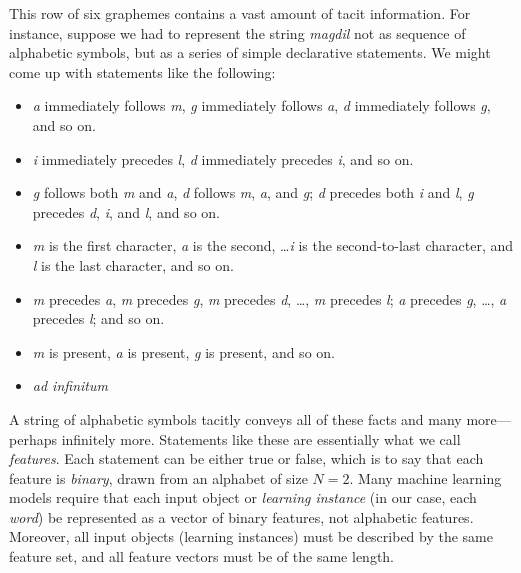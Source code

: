 This row of six graphemes contains a vast amount of tacit information. For instance, suppose we had to represent the string \textit{magdil} not as sequence of alphabetic symbols, but as a series of simple declarative statements. We might come up with statements like the following: 
\begin{itemize}
  \item \textit{a} immediately follows \textit{m}, \textit{g} immediately follows \textit{a}, \textit{d} immediately follows \textit{g}, and so on. 
  \item \textit{i} immediately precedes \textit{l}, \textit{d} immediately precedes \textit{i}, and so on. %
   \item \textit{g} follows both \textit{m} and \textit{a}, \textit{d} follows \textit{m}, \textit{a}, and \textit{g}; \textit{d} precedes both \textit{i} and \textit{l}, \textit{g} precedes \textit{d}, \textit{i}, and \textit{l}, and so on.
   \item \textit{m} is the first character, \textit{a} is the second, \dots \textit{i} is the second-to-last character, and \textit{l} is the last character, and so on.
   \item \textit{m} precedes \textit{a}, \textit{m} precedes \textit{g}, \textit{m} precedes \textit{d}, \dots, \textit{m} precedes \textit{l}; \textit{a} precedes \textit{g}, \dots , \textit{a} precedes \textit{l}; and so on.
   \item \textit{m} is present, \textit{a} is present, \textit{g} is present, and so on.
   \item \emph{ad infinitum}
\end{itemize}
A string of alphabetic symbols tacitly conveys all of these facts and many more---perhaps infinitely more.
Statements like these are essentially what we call \emph{features}.
Each statement can be either true or false, which is to say that each feature is \emph{binary}, drawn from an alphabet of size $N = 2$.  
Many machine learning models require that each input object or \emph{learning instance} (in our case, each \emph{word}) be represented as a vector of binary features, not alphabetic features. Moreover, all input objects (learning instances) must be described by the same feature set, and all feature vectors must be of the same length.

